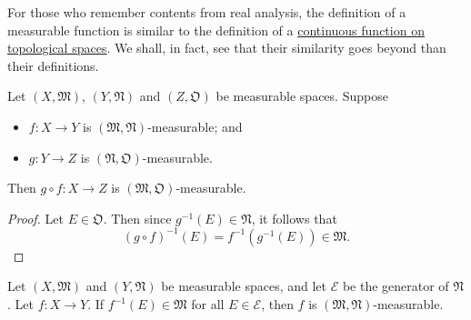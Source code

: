 \documentclass[notoc,notitlepage]{tufte-book}
\begin{document}
\begin{remark}
  For those who remember contents from real analysis,
  the definition of a measurable function is similar
  to the definition of a
  \href{https://tex.japorized.ink/PMATH351F18/classnotes.pdf\#thm.43}{continuous function on topological spaces}.
  We shall, in fact, see that their similarity goes beyond than
  their definitions.
\end{remark}

\begin{propo}\label{propo:composition_of_measurable_functions}
  Let $(X, \mathfrak{M})$, $(Y, \mathfrak{N})$ and $(Z, \mathfrak{O})$ be
  measurable spaces.
  Suppose
  \begin{itemize}
    \item $f : X \to Y$ is $(\mathfrak{M}, \mathfrak{N})$-measurable; and
    \item $g : Y \to Z$ is $(\mathfrak{N}, \mathfrak{O})$-measurable.
  \end{itemize}
  Then $g \circ f : X \to Z$ is $(\mathfrak{M}, \mathfrak{O})$-measurable.
\end{propo}

\begin{proof}
  Let $E \in \mathfrak{O}$.
  Then since $g^{-1}(E) \in \mathfrak{N}$, it follows that
  \begin{equation*}
    (g \circ f)^{-1}(E) = f^{-1}(g^{-1}(E)) \in \mathfrak{M}.
  \end{equation*}
\end{proof}

\begin{propo}\label{propo:measurability_of_a_function_defined_on_generators_of_the_codomain}
  Let $(X, \mathfrak{M})$ and $(Y, \mathfrak{N})$ be measurable spaces,
  and let $\mathcal{E}$ be the generator of $\mathfrak{N}$.
  Let $f : X \to Y$.
  If $f^{-1}(E) \in \mathfrak{M}$ for all $E \in \mathcal{E}$,
  then $f$ is $(\mathfrak{M}, \mathfrak{N})$-measurable.
\end{propo}
\end{document}
